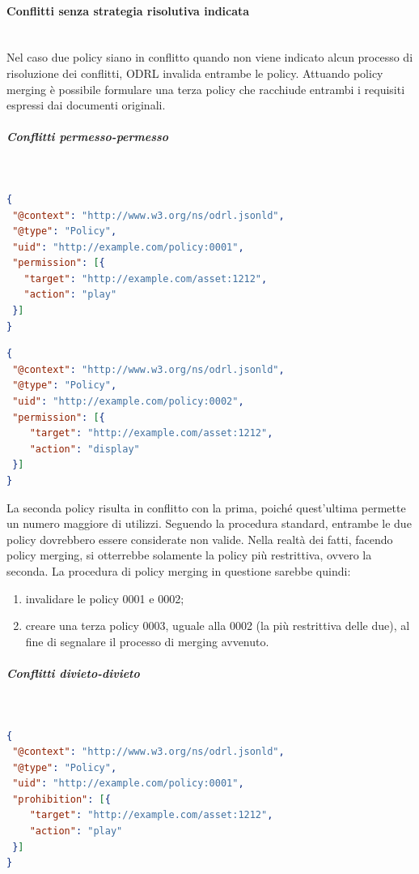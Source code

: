 \documentclass[12pt,a4paper,twoside]{book}
\begin{document}
\paragraph{Conflitti senza strategia risolutiva indicata}\label{noStrat}\mbox{}\\
Nel caso due policy siano in conflitto quando non viene indicato alcun processo di risoluzione dei conflitti, ODRL invalida entrambe le policy. Attuando policy merging è possibile formulare una terza policy che racchiude entrambi i requisiti espressi dai documenti originali.
\subparagraph{Conflitti permesso-permesso}\label{permperm}\mbox{}\\
\begin{lstlisting}[language=json,firstnumber=1,caption={La policy 0001 permette un qualsiasi utilizzo dell'asset 1212 a chiunque},captionpos=b]
{
 "@context": "http://www.w3.org/ns/odrl.jsonld",
 "@type": "Policy",
 "uid": "http://example.com/policy:0001",
 "permission": [{
   "target": "http://example.com/asset:1212",
   "action": "play"
 }]
}
\end{lstlisting}
\begin{lstlisting}[language=json,firstnumber=1,caption={La policy 0002 permette la riproduzione dell'asset 1212 a chiunque},captionpos=b]
{
 "@context": "http://www.w3.org/ns/odrl.jsonld",
 "@type": "Policy",
 "uid": "http://example.com/policy:0002",
 "permission": [{
    "target": "http://example.com/asset:1212",
    "action": "display"
 }]
}
\end{lstlisting}
La seconda policy risulta in conflitto con la prima, poiché quest'ultima permette un numero maggiore di utilizzi. Seguendo la procedura standard, entrambe le due policy dovrebbero essere considerate non valide. Nella realtà dei fatti, facendo policy merging, si otterrebbe solamente la policy più restrittiva, ovvero la seconda. La procedura di policy merging in questione sarebbe quindi: 
\begin{enumerate}
	\item invalidare le policy 0001 e 0002;
	\item creare una terza policy 0003, uguale alla 0002 (la più restrittiva delle due), al fine di segnalare il processo di merging avvenuto.
\end{enumerate}
\subparagraph{Conflitti divieto-divieto}\label{divdiv}\mbox{}\\
\begin{lstlisting}[language=json,firstnumber=1,caption={La policy 0001 proibisce un qualsiasi utilizzo dell'asset 1212 a chiunque},captionpos=b]
{
 "@context": "http://www.w3.org/ns/odrl.jsonld",
 "@type": "Policy",
 "uid": "http://example.com/policy:0001",
 "prohibition": [{
    "target": "http://example.com/asset:1212",
    "action": "play"
 }]
}
\end{lstlisting}
\end{document}
